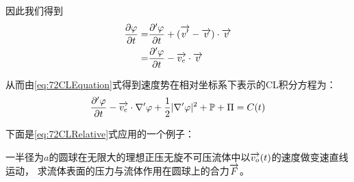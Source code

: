 因此我们得到
\begin{align}\notag
\frac{\partial \varphi}{\partial t}=&\frac{\partial' \varphi}{\partial t}+(\overrightarrow{v'}-\overrightarrow{v})\cdot \overrightarrow{v}\\
=&\frac{\partial' \varphi}{\partial t}-\overrightarrow{v_e}\cdot \overrightarrow{v}
\end{align}

从而由\eqref{eq:72CLEquation}式得到速度势在相对坐标系下表示的CL积分方程为：
\begin{equation}\label{eq:72CLRelative}
\frac{\partial' \varphi}{\partial t}-\overrightarrow{v_e}\cdot \nabla'\varphi+\frac{1}{2} |\nabla'\varphi|^2+\mathbb{P}+\Pi=C(t)
\end{equation}

下面是\eqref{eq:72CLRelative}式应用的一个例子：

一半径为$a$的圆球在无限大的理想正压无旋不可压流体中以$\overrightarrow{v_o}(t)$的速度做变速直线运动，
求流体表面的压力与流体作用在圆球上的合力$\overrightarrow{F}$。

